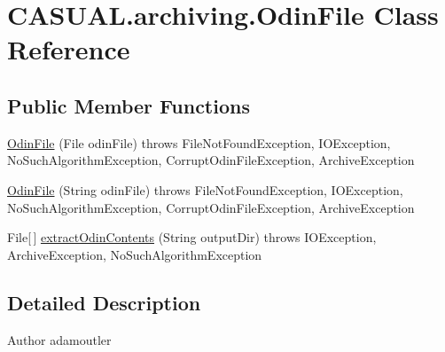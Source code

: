 \hypertarget{classCASUAL_1_1archiving_1_1OdinFile}{\section{C\-A\-S\-U\-A\-L.\-archiving.\-Odin\-File Class Reference}
\label{classCASUAL_1_1archiving_1_1OdinFile}
}
\subsection*{Public Member Functions}
\begin{DoxyCompactItemize}
\item 
\hyperlink{classCASUAL_1_1archiving_1_1OdinFile_a89c41c4bc7f61f112fc06b61bd8dda88}{Odin\-File} (File odin\-File)  throws File\-Not\-Found\-Exception, I\-O\-Exception, No\-Such\-Algorithm\-Exception, Corrupt\-Odin\-File\-Exception, Archive\-Exception 
\item 
\hyperlink{classCASUAL_1_1archiving_1_1OdinFile_a68fe33b8b91c48ce0bf31d821b666e0b}{Odin\-File} (String odin\-File)  throws File\-Not\-Found\-Exception, I\-O\-Exception, No\-Such\-Algorithm\-Exception, Corrupt\-Odin\-File\-Exception, Archive\-Exception 
\item 
File\mbox{[}$\,$\mbox{]} \hyperlink{classCASUAL_1_1archiving_1_1OdinFile_a1c6900921a7fedd0ed75c9003e8b64b0}{extract\-Odin\-Contents} (String output\-Dir)  throws I\-O\-Exception, Archive\-Exception, No\-Such\-Algorithm\-Exception 
\end{DoxyCompactItemize}


\subsection{Detailed Description}
\begin{DoxyAuthor}{Author}
adamoutler 
\end{DoxyAuthor}


